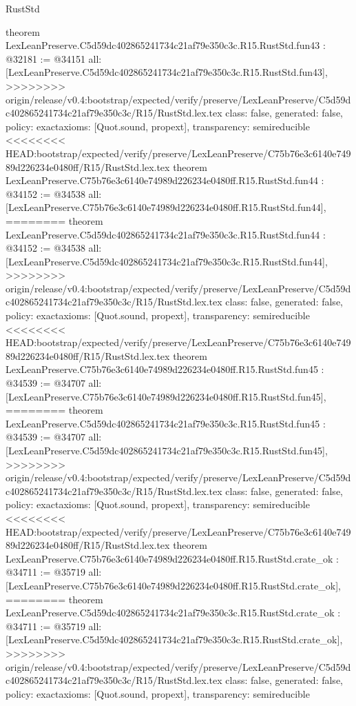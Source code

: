 \begin{lexlean}{RustStd}
\begin{coremodule}
{\begin{coremodule}
{{{{{{{{{{{{{{{{{{{{{{{{{{{{{{{{{{{{{{{{{{{{{{theorem LexLeanPreserve.C5d59dc402865241734c21af79e350c3c.R15.RustStd.fun43 : @32181 := @34151 {
  all: [LexLeanPreserve.C5d59dc402865241734c21af79e350c3c.R15.RustStd.fun43],
>>>>>>>> origin/release/v0.4:bootstrap/expected/verify/preserve/LexLeanPreserve/C5d59dc402865241734c21af79e350c3c/R15/RustStd.lex.tex
  class: false,
  generated: false,
  policy: exact{axioms: [Quot.sound, propext]},
  transparency: semireducible
}
<<<<<<<< HEAD:bootstrap/expected/verify/preserve/LexLeanPreserve/C75b76e3c6140e74989d226234e0480ff/R15/RustStd.lex.tex
theorem LexLeanPreserve.C75b76e3c6140e74989d226234e0480ff.R15.RustStd.fun44 : @34152 := @34538 {
  all: [LexLeanPreserve.C75b76e3c6140e74989d226234e0480ff.R15.RustStd.fun44],
========
theorem LexLeanPreserve.C5d59dc402865241734c21af79e350c3c.R15.RustStd.fun44 : @34152 := @34538 {
  all: [LexLeanPreserve.C5d59dc402865241734c21af79e350c3c.R15.RustStd.fun44],
>>>>>>>> origin/release/v0.4:bootstrap/expected/verify/preserve/LexLeanPreserve/C5d59dc402865241734c21af79e350c3c/R15/RustStd.lex.tex
  class: false,
  generated: false,
  policy: exact{axioms: [Quot.sound, propext]},
  transparency: semireducible
}
<<<<<<<< HEAD:bootstrap/expected/verify/preserve/LexLeanPreserve/C75b76e3c6140e74989d226234e0480ff/R15/RustStd.lex.tex
theorem LexLeanPreserve.C75b76e3c6140e74989d226234e0480ff.R15.RustStd.fun45 : @34539 := @34707 {
  all: [LexLeanPreserve.C75b76e3c6140e74989d226234e0480ff.R15.RustStd.fun45],
========
theorem LexLeanPreserve.C5d59dc402865241734c21af79e350c3c.R15.RustStd.fun45 : @34539 := @34707 {
  all: [LexLeanPreserve.C5d59dc402865241734c21af79e350c3c.R15.RustStd.fun45],
>>>>>>>> origin/release/v0.4:bootstrap/expected/verify/preserve/LexLeanPreserve/C5d59dc402865241734c21af79e350c3c/R15/RustStd.lex.tex
  class: false,
  generated: false,
  policy: exact{axioms: [Quot.sound, propext]},
  transparency: semireducible
}
<<<<<<<< HEAD:bootstrap/expected/verify/preserve/LexLeanPreserve/C75b76e3c6140e74989d226234e0480ff/R15/RustStd.lex.tex
theorem LexLeanPreserve.C75b76e3c6140e74989d226234e0480ff.R15.RustStd.crate_ok : @34711 := @35719 {
  all: [LexLeanPreserve.C75b76e3c6140e74989d226234e0480ff.R15.RustStd.crate_ok],
========
theorem LexLeanPreserve.C5d59dc402865241734c21af79e350c3c.R15.RustStd.crate_ok : @34711 := @35719 {
  all: [LexLeanPreserve.C5d59dc402865241734c21af79e350c3c.R15.RustStd.crate_ok],
>>>>>>>> origin/release/v0.4:bootstrap/expected/verify/preserve/LexLeanPreserve/C5d59dc402865241734c21af79e350c3c/R15/RustStd.lex.tex
  class: false,
  generated: false,
  policy: exact{axioms: [Quot.sound, propext]},
  transparency: semireducible
}}}}}}}}}}}}}}}}}}}}}}}}}}}}}}}}}}}}}}}}}}}}}}}}}}
\end{coremodule}}
\end{coremodule}
\end{lexlean}
